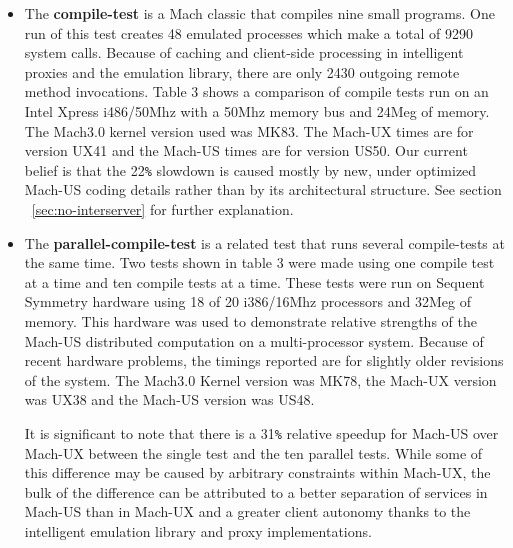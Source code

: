 \begin{itemize}
\item The {\bf compile-test} is a Mach classic that compiles
nine small programs. One run of this test creates 48 emulated
processes which make a total of 9290 system calls.
Because of caching and client-side processing in
intelligent proxies and the emulation library, there are only 2430
outgoing remote method invocations.
Table 3\comment{~\ref{fig:times}} shows a comparison of compile tests run on
an Intel Xpress i486/50Mhz with a 50Mhz memory bus and 24Meg of memory.
The Mach3.0 kernel version used was MK83.
The Mach-UX times are for version UX41 and the
Mach-US times are for version US50.
Our current belief is that the 22\verb"%" slowdown is caused mostly by
new, under optimized Mach-US coding details rather than by its architectural
structure. See section ~\ref{sec:no-interserver} for further explanation.

\item The {\bf parallel-compile-test} is a related test that runs
several compile-tests at the same time.  Two tests shown in
table 3\comment{~\ref{fig:times}} were made using one compile test at a time
and ten compile tests at a time.
These tests were run on  Sequent Symmetry hardware
using 18 of 20 i386/16Mhz processors and 32Meg of memory.
This hardware was used
to demonstrate relative strengths of the Mach-US distributed computation
on a multi-processor system. Because of recent
hardware problems, the timings reported are for slightly older revisions
of the system.
The Mach3.0 Kernel version was MK78, the Mach-UX version was UX38 and
the Mach-US version was US48.  

It is significant to note that there is
a 31\verb"%" relative speedup for Mach-US over Mach-UX between the
single test and the ten parallel tests.
While some of this difference may be caused by
arbitrary constraints within Mach-UX,
the bulk of the difference can be attributed
to a better separation of services in Mach-US than in Mach-UX and a
greater client autonomy thanks to the intelligent emulation library and proxy
implementations.  


\end{itemize}
